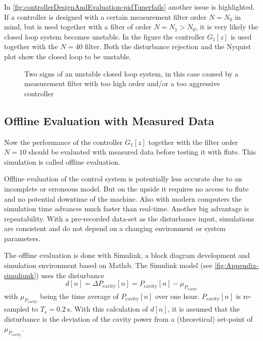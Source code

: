 In \autoref{fig:controllerDesignAndEvaluation-pidTunerfails} another issue is highlighted. If a controller is designed with a certain measurement filter order $N=N_0$ in mind, but is used together with a filter of order $N=N_1>N_0$, it is very likely the closed loop system becomes unstable. In the figure the controller $G_1[z]$ is used together with the $N=40$ filter. Both the disturbance rejection and the Nyquist plot show the closed loop to be unstable.

\begin{figure}[tb]
    \centering
        \qquad
       \caption{Two signs of an unstable closed loop system, in this case caused by a measurement filter with too high order and/or a too aggressive controller}
    \label{fig:controllerDesignAndEvaluation-pidTunerfails}
\end{figure}


\subsection{Offline Evaluation with Measured Data}
Now the performance of the controller $G_1[z]$ together with the filter order $N=10$ should be evaluated with measured data before testing it with \gls{flute}. This simulation is called offline evaluation.

Offline evaluation of the control system is potentially less accurate due to an incomplete or erroneous model. But on the upside it requires no access to \gls{flute} and no potential downtime of the machine. Also with modern computers the simulation time advances much faster than real-time. Another big advantage is repeatability. With a pre-recorded data-set as the disturbance input, simulations are consistent and do not depend on a changing environment or system parameters.

The offline evaluation is done with Simulink, a block diagram development and simulation environment based on Matlab. The Simulink model (see \autoref{fig:Appendix-simuliunk}) uses the disturbance
\begin{equation}
d[n] = \Delta P_\text{cavity}[n] = P_\text{cavity}[n] - \mu_{P_\text{cavity}}
\end{equation}
with $\mu_{P_\text{cavity}}$ being the time average of $P_\text{cavity}[n]$ over one hour. $P_\text{cavity}[n]$ is re-sampled to $T_s=\SI{0.2}{\second}$.
With this calculation of $d[n]$, it is assumed that the disturbance is the deviation of the cavity power from a (theoretical) set-point of $\mu_{P_\text{cavity}}$.

